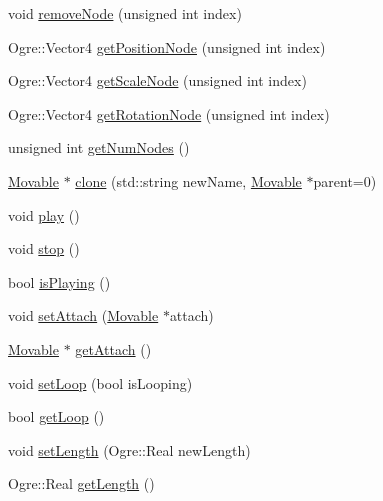 \begin{DoxyCompactItemize}
void \hyperlink{class_rad_xml_1_1_animation_track_object_a460e389f1683762c9832e586817d02c8}{remove\-Node} (unsigned int index)
\item 
Ogre\-::\-Vector4 \hyperlink{class_rad_xml_1_1_animation_track_object_acbd9c50e50fa692ae0a15905dfb4ca0f}{get\-Position\-Node} (unsigned int index)
\item 
Ogre\-::\-Vector4 \hyperlink{class_rad_xml_1_1_animation_track_object_aea69a25eea0291f7ba5045e11a160c4b}{get\-Scale\-Node} (unsigned int index)
\item 
Ogre\-::\-Vector4 \hyperlink{class_rad_xml_1_1_animation_track_object_a812fd799b09c3aec61aa4ad85ddcb9e4}{get\-Rotation\-Node} (unsigned int index)
\item 
unsigned int \hyperlink{class_rad_xml_1_1_animation_track_object_ac70b28eb438181668163b773b3f9f9ed}{get\-Num\-Nodes} ()
\item 
\hyperlink{class_rad_xml_1_1_movable}{Movable} $\ast$ \hyperlink{class_rad_xml_1_1_animation_track_object_a3aa936852262622e2b838c62ada5a441}{clone} (std\-::string new\-Name, \hyperlink{class_rad_xml_1_1_movable}{Movable} $\ast$parent=0)
\item 
void \hyperlink{class_rad_xml_1_1_animation_track_object_a94e717a96f7128551a71ab9b7e4c7335}{play} ()
\item 
void \hyperlink{class_rad_xml_1_1_animation_track_object_ab002cbf9834e11ea32ffeb8ee0155e44}{stop} ()
\item 
bool \hyperlink{class_rad_xml_1_1_animation_track_object_af2caa28781d3cda2472b7f976c302942}{is\-Playing} ()
\item 
void \hyperlink{class_rad_xml_1_1_animation_track_object_a7230b18d808ab46483992a2b0d881a15}{set\-Attach} (\hyperlink{class_rad_xml_1_1_movable}{Movable} $\ast$attach)
\item 
\hyperlink{class_rad_xml_1_1_movable}{Movable} $\ast$ \hyperlink{class_rad_xml_1_1_animation_track_object_af8592269589de88b11c4104693c8862d}{get\-Attach} ()
\item 
void \hyperlink{class_rad_xml_1_1_animation_track_object_ad5592be8a86dc3abbf20c3a7985435f2}{set\-Loop} (bool is\-Looping)
\item 
bool \hyperlink{class_rad_xml_1_1_animation_track_object_a3a3dee414e29e70a7d0c9dfada7b2b43}{get\-Loop} ()
\item 
void \hyperlink{class_rad_xml_1_1_animation_track_object_a30d2726b4df85d54677af99365a5abf8}{set\-Length} (Ogre\-::\-Real new\-Length)
\item 
Ogre\-::\-Real \hyperlink{class_rad_xml_1_1_animation_track_object_a345674595ee68b0af27faa865107152a}{get\-Length} ()
\end{DoxyCompactItemize}

